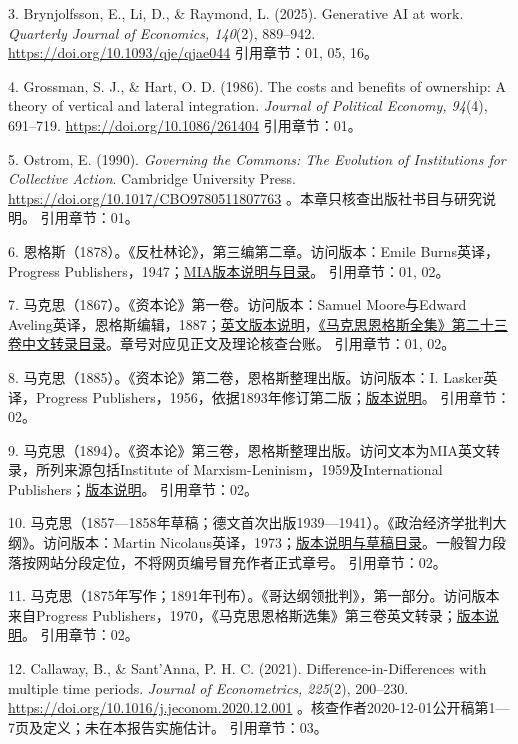 \documentclass[UTF8,fontset=windows,12pt,a4paper,oneside,openany]{ctexbook}
\begin{document}
3. Brynjolfsson, E., Li, D., \& Raymond, L. (2025). Generative AI at work. \emph{Quarterly Journal of Economics, 140}(2), 889–942. \url{https://doi.org/10.1093/qje/qjae044}
引用章节：01, 05, 16。

4. Grossman, S. J., \& Hart, O. D. (1986). The costs and benefits of ownership: A theory of vertical and lateral integration. \emph{Journal of Political Economy, 94}(4), 691–719. \url{https://doi.org/10.1086/261404}
引用章节：01。

5. Ostrom, E. (1990). \emph{Governing the Commons: The Evolution of Institutions for Collective Action}. Cambridge University Press. \url{https://doi.org/10.1017/CBO9780511807763} 。本章只核查出版社书目与研究说明。
引用章节：01。

6. 恩格斯（1878）。《反杜林论》，第三编第二章。访问版本：Emile Burns英译，Progress Publishers，1947；\href{https://www.marxists.org/archive/marx/works/1877/anti-duhring/index.htm}{MIA版本说明与目录}。
引用章节：01, 02。

7. 马克思（1867）。《资本论》第一卷。访问版本：Samuel Moore与Edward Aveling英译，恩格斯编辑，1887；\href{https://www.marxists.org/archive/marx/works/1867-c1/index.htm}{英文版本说明}，\href{https://www.marxists.org/chinese/marx-engels/23/index.htm}{《马克思恩格斯全集》第二十三卷中文转录目录}。章号对应见正文及理论核查台账。
引用章节：01, 02。

8. 马克思（1885）。《资本论》第二卷，恩格斯整理出版。访问版本：I. Lasker英译，Progress Publishers，1956，依据1893年修订第二版；\href{https://www.marxists.org/archive/marx/works/1885-c2/index.htm}{版本说明}。
引用章节：02。

9. 马克思（1894）。《资本论》第三卷，恩格斯整理出版。访问文本为MIA英文转录，所列来源包括Institute of Marxism-Leninism，1959及International Publishers；\href{https://www.marxists.org/archive/marx/works/1894-c3/index.htm}{版本说明}。
引用章节：02。

10. 马克思（1857—1858年草稿；德文首次出版1939—1941）。《政治经济学批判大纲》。访问版本：Martin Nicolaus英译，1973；\href{https://www.marxists.org/archive/marx/works/1857/grundrisse/index.htm}{版本说明与草稿目录}。一般智力段落按网站分段定位，不将网页编号冒充作者正式章号。
引用章节：02。

11. 马克思（1875年写作；1891年刊布）。《哥达纲领批判》，第一部分。访问版本来自Progress Publishers，1970，《马克思恩格斯选集》第三卷英文转录；\href{https://www.marxists.org/archive/marx/works/1875/gotha/index.htm}{版本说明}。
引用章节：02。

12. Callaway, B., \& Sant’Anna, P. H. C. (2021). Difference-in-Differences with multiple time periods. \emph{Journal of Econometrics, 225}(2), 200–230. \url{https://doi.org/10.1016/j.jeconom.2020.12.001} 。核查作者2020-12-01公开稿第1—7页及定义；未在本报告实施估计。
引用章节：03。
\end{document}
